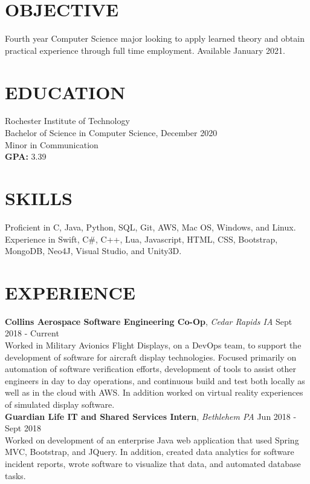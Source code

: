 \documentclass[line, resmargin]{res}
\begin{document}
\address{(484) 554-8487\\ emp9173@rit.edu}

\begin{resume}
\vspace{-7.5mm} %

\section{OBJECTIVE}
Fourth year Computer Science major looking to apply learned theory and obtain practical experience through full time employment.  Available January 2021.

\section{EDUCATION} 
 Rochester Institute of Technology \\
 Bachelor of Science in Computer Science, December 2020\\
 Minor in Communication\\
 \textbf{GPA:} 3.39
 
\section{SKILLS}
Proficient in C, Java, Python, SQL, Git, AWS, Mac OS, Windows, and Linux. \\
Experience in Swift, C\#, C++, Lua, Javascript, HTML, CSS, Bootstrap, MongoDB, Neo4J, Visual Studio, and Unity3D.
 
 
\section{EXPERIENCE} 
\textbf{Collins Aerospace Software Engineering Co-Op}, \textit{Cedar Rapids IA} \hfill Sept 2018 - Current \\
Worked in Military Avionics Flight Displays, on a DevOps team, to support the development of software for aircraft display technologies.  Focused primarily on automation of software verification efforts, development of tools to assist other engineers in day to day operations, and continuous build and test both locally as well as in the cloud with AWS.  In addition worked on virtual reality experiences of simulated display software.\\ [10pt]
\textbf{Guardian Life IT and Shared Services Intern}, \textit{Bethlehem PA} \hfill Jun 2018 - Sept 2018 \\
Worked on development of an enterprise Java web application that used Spring MVC, Bootstrap, and JQuery.  In addition, created
data analytics for software incident reports, wrote software to visualize that data, and automated database tasks. \\
\vspace{-5.5mm}



\end{resume}
\end{document}

